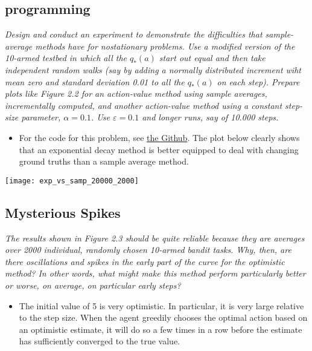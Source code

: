 \documentclass{article}
\begin{document}
\subsection{programming}
\textit{Design and conduct an experiment to demonstrate the difficulties that sample-average methods have for nostationary problems. Use a modified version of the 10-armed testbed in which all the $q_* (a)$ start out equal and then take independent random walks (say by adding a normally distributed increment wiht mean zero and standard deviation 0.01 to all the $q_* (a)$ on each step). Prepare plots like Figure 2.2 for an action-value method using sample averages, incrementally computed, and another action-value method using a constant step-size parameter, $\alpha = 0.1$. Use $\varepsilon = 0.1$ and longer runs, say of 10.000 steps. }
\begin{itemize}
\item For the code for this problem, see \href{https://github.com/kenbeek/reinforcement-learning-sutton-barto/tree/main/rlcode/chapter02}{the Github}. The plot below clearly shows that an exponential decay method is better equipped to deal with changing ground truths than a sample average method.
\end{itemize}
\texttt{[image: exp\_vs\_samp\_20000\_2000]}


\subsection{Mysterious Spikes}
\textit{The results shown in Figure 2.3 should be quite reliable because they are averages over 2000 individual, randomly chosen 10-armed bandit tasks. Why, then, are there oscillations and spikes in the early part of the curve for the optimistic method? In other words, what might make this method perform particularly better or worse, on average, on particular early steps?}
\begin{itemize}
\item The initial value of 5 is very optimistic. In particular, it is very large relative to the step size. When the agent greedily chooses the optimal action based on an optimistic estimate, it will do so a few times in a row before the estimate has sufficiently converged to the true value.
\end{itemize}
\end{document}
